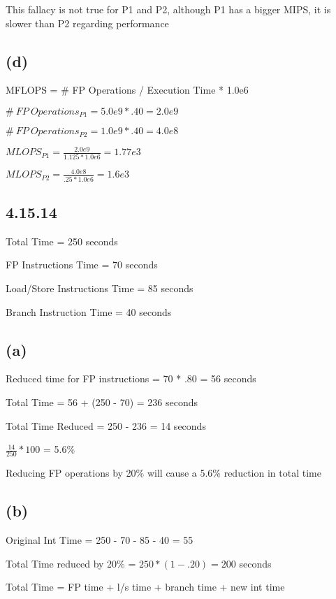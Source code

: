 \documentclass{article}
\begin{document}
    This fallacy is not true for P1 and P2, although P1 has a bigger MIPS, it is slower than P2 regarding performance
    \subsection*{(d)}

    MFLOPS = \# FP Operations / Execution Time * 1.0e6

    $\#\ FP\ Operations_{P1} = 5.0e9 * .40 = 2.0e9$

    $\#\ FP\ Operations_{P2} = 1.0e9 * .40 = 4.0e8$
    \vspace*{6pt}

    $MLOPS_{P1} = \frac{2.0e9}{1.125 * 1.0e6} = 1.77e3$
    \vspace*{6pt}

    $MLOPS_{P2} = \frac{4.0e8}{.25 * 1.0e6} = 1.6e3$
    
    \subsection*{4.15.14}

    Total Time = 250 seconds

    FP Instructions Time = 70 seconds

    Load/Store Instructions Time = 85 seconds

    Branch Instruction Time = 40 seconds

    \subsection*{(a)}

    Reduced time for FP instructions = 70 * .80 = 56 seconds

    Total Time = 56 + (250 - 70) = 236 seconds

    Total Time Reduced = 250 - 236 = 14 seconds

    $\frac{14}{250} * 100$ = 5.6\%

    Reducing FP operations by 20\% will cause a 5.6\% reduction in total time

    \subsection*{(b)}

    Original Int Time = 250 - 70 - 85 - 40 = 55

    Total Time reduced by 20\% = $250 * (1-.20) = 200$ seconds

    Total Time = FP time + l/s time + branch time + new int time
\end{document}
